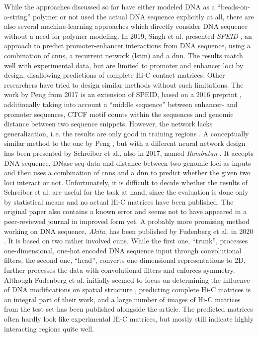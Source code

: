 While the approaches discussed so far have either modeled DNA as a ``beads-on-a-string'' polymer or not used the actual DNA sequence explicitly at all,
there are also several machine-learning approaches which directly consider DNA sequence without a need for polymer modeling.
In 2019, Singh et al. presented \emph{SPEID} \cite{Singh2019}, an approach to predict promoter-enhancer interactions from DNA sequence,
using a combination of \acrshort{cnn}s, a recurrent network (\acrshort{lstm}) and a \acrshort{dnn}.
The results match well with experimental data, but are limited to promoter and enhancer loci by design, disallowing predictions of complete Hi-C contact matrices.
Other researchers have tried to design similar methods without such limitations.
The work by Peng from 2017 \cite{peng2017} is an extension of SPEID, based on a 2016 preprint \cite{Singh2016}, 
additionally taking into account a ``middle sequence'' between enhancer- and promoter sequences,
CTCF motif counts within the sequences and genomic distance between two sequence snippets. 
However, the network lacks generalization, i.\,e. the results are only good in training regions \cite[figs. 4, 5]{peng2017}.
A conceptually similar method to the one by Peng \cite{peng2017}, but with a different neural network design has been presented by Schreiber et al., also in 2017, 
named \emph{Rambutan} \cite{Schreiber2017}.
It accepts DNA sequence, DNase-seq data and distance between two genomic loci as inputs 
and then uses a combination of \acrshort{cnn}s and a \acrshort{dnn} to predict whether the given two loci interact or not. 
Unfortunately, it is difficult to decide whether the results of Schreiber et al. are useful for the task at hand, since the evaluation is done only by statistical means 
and no actual Hi-C matrices have been published.
The original paper \cite{Schreiber2017} also contains a known error and seems not to have appeared in a peer-reviewed journal in improved form 
yet. 
A probably more promising method working on DNA sequence, \emph{Akita}, has been published by Fudenberg et al. in 2020 \cite{Fudenberg2020}.
It is based on two rather involved \acrlong{cnn}s. 
While the first one, ``trunk'', processes one-dimensional, one-hot encoded DNA sequence input through convolutional filters, the second one, ``head'', 
converts one-dimensional representations to 2D, further processes the data with convolutional filters and enforces symmetry.
Although Fudenberg et al. initially seemed to focus on determining the influence of DNA modifications on spatial structure \cite{Fudenberg2019},
predicting complete Hi-C matrices is an integral part of their work, 
and a large number of images of Hi-C matrices from the test set has been published alongside the article. 
The predicted matrices often hardly look like experimental Hi-C matrices, but mostly still indicate highly interacting regions quite well.

